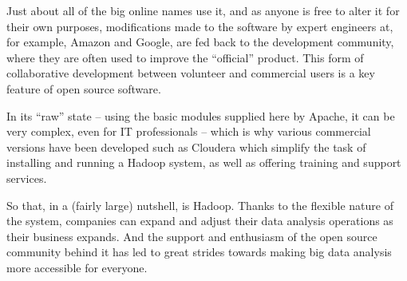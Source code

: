 \documentclass[11pt]{article} %
\begin{document}
Just about all of the big online names use it, and as anyone is free to alter it for their own purposes, modifications made to the software by expert engineers at, for example, Amazon and Google, are fed back to the development community, where they are often used to improve the “official” product. This form of collaborative development between volunteer and commercial users is a key feature of open source software.

In its “raw” state – using the basic modules supplied here by Apache, it can be very complex, even for IT professionals – which is why various commercial versions have been developed such as Cloudera which simplify the task of installing and running a Hadoop system, as well as offering training and support services.

 So that, in a (fairly large) nutshell, is Hadoop. Thanks to the flexible nature of the system, companies can expand and adjust their data analysis operations as their business expands. And the support and enthusiasm of the open source community behind it has led to great strides towards making big data analysis more accessible for everyone.
\end{document}
